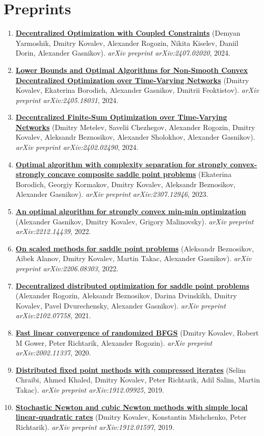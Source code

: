 \section{Preprints}
\begin{enumerate}
\item
\textbf{\href{https://arxiv.org/abs/2407.02020}{Decentralized Optimization with Coupled Constraints}} (Demyan Yarmoshik, Dmitry Kovalev, Alexander Rogozin, Nikita Kiselev, Daniil Dorin, Alexander Gasnikov). \textit{arXiv preprint arXiv:2407.02020}, 2024.
\item
\textbf{\href{https://arxiv.org/abs/2405.18031}{Lower Bounds and Optimal Algorithms for Non-Smooth Convex Decentralized Optimization over Time-Varying Networks}} (Dmitry Kovalev, Ekaterina Borodich, Alexander Gasnikov, Dmitrii Feoktistov). \textit{arXiv preprint arXiv:2405.18031}, 2024.
\item
\textbf{\href{https://arxiv.org/abs/2402.02490}{Decentralized Finite-Sum Optimization over Time-Varying Networks}} (Dmitry Metelev, Savelii Chezhegov, Alexander Rogozin, Dmitry Kovalev, Aleksandr Beznosikov, Alexander Sholokhov, Alexander Gasnikov). \textit{arXiv preprint arXiv:2402.02490}, 2024.
\item
\textbf{\href{https://arxiv.org/abs/2307.12946}{Optimal algorithm with complexity separation for strongly convex-strongly concave composite saddle point problems}} (Ekaterina Borodich, Georgiy Kormakov, Dmitry Kovalev, Aleksandr Beznosikov, Alexander Gasnikov). \textit{arXiv preprint arXiv:2307.12946}, 2023.
\item
\textbf{\href{https://arxiv.org/abs/2212.14439}{An optimal algorithm for strongly convex min-min optimization}} (Alexander Gasnikov, Dmitry Kovalev, Grigory Malinovsky). \textit{arXiv preprint arXiv:2212.14439}, 2022.
\item
\textbf{\href{https://arxiv.org/abs/2206.08303}{On scaled methods for saddle point problems}} (Aleksandr Beznosikov, Aibek Alanov, Dmitry Kovalev, Martin Takac, Alexander Gasnikov). \textit{arXiv preprint arXiv:2206.08303}, 2022.
\item
\textbf{\href{https://arxiv.org/abs/2102.07758}{Decentralized distributed optimization for saddle point problems}} (Alexander Rogozin, Aleksandr Beznosikov, Darina Dvinskikh, Dmitry Kovalev, Pavel Dvurechensky, Alexander Gasnikov). \textit{arXiv preprint arXiv:2102.07758}, 2021.
\item
\textbf{\href{https://arxiv.org/abs/2002.11337}{Fast linear convergence of randomized BFGS}} (Dmitry Kovalev, Robert M Gower, Peter Richtarik, Alexander Rogozin). \textit{arXiv preprint arXiv:2002.11337}, 2020.
\item
\textbf{\href{https://arxiv.org/abs/1912.09925}{Distributed fixed point methods with compressed iterates}} (Selim Chraibi, Ahmed Khaled, Dmitry Kovalev, Peter Richtarik, Adil Salim, Martin Takac). \textit{arXiv preprint arXiv:1912.09925}, 2019.
\item
\textbf{\href{https://arxiv.org/abs/1912.01597}{Stochastic Newton and cubic Newton methods with simple local linear-quadratic rates}} (Dmitry Kovalev, Konstantin Mishchenko, Peter Richtarik). \textit{arXiv preprint arXiv:1912.01597}, 2019.
\end{enumerate}
